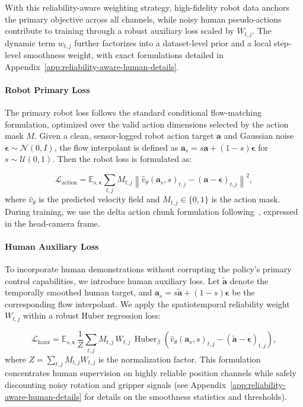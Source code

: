 \documentclass{llmxive}
\begin{document}
With this reliability-aware weighting strategy, high-fidelity robot data anchors the primary objective across all channels, while noisy human pseudo-actions contribute to training through a robust auxiliary loss scaled by \(W_{t,j}\). The dynamic term \(w_{t,j}\) further factorizes into a dataset-level prior and a local step-level smoothness weight, with exact formulations detailed in Appendix~\ref{app:reliability-aware-human-details}.

\paragraph{Robot Primary Loss}

The primary robot loss follows the standard conditional flow-matching formulation, optimized over the valid action dimensions selected by the action mask $M$. Given a clean, sensor-logged robot action target $\mathbf{a}$ and Gaussian noise $\boldsymbol{\epsilon} \sim \mathcal{N}(0, I)$, the flow interpolant is defined as $\mathbf{a}_s = s\mathbf{a} + (1{-}s)\boldsymbol{\epsilon}$ for $s \sim \mathcal{U}(0,1)$. Then the robot loss is formulated as:


\begin{equation}
\label{equ:action_loss}
\mathcal{L}_{\mathrm{action}}
=
\mathbb{E}_{s,\boldsymbol{\epsilon}}
\sum_{t,j}
M_{t,j}
\left\|
\hat{v}_\theta(\mathbf{a}_s, s)_{t,j}
-
(\mathbf{a} - \boldsymbol{\epsilon})_{t,j}
\right\|^2,
\end{equation}
where $\hat{v}_\theta$ is the predicted velocity field and $M_{t,j} \in \{0,1\}$ is the action mask. During training, we use the delta action chunk formulation following~\cite{BlackK-RSS-25}, expressed in the head-camera frame.



\paragraph{Human Auxiliary Loss}
\label{sec:human-auxiliary-loss}

To incorporate human demonstrations without corrupting the policy's primary control capabilities, we introduce human auxiliary loss. Let $\tilde{\mathbf{a}}$ denote the temporally smoothed human target, and $\mathbf{a}_s = s\tilde{\mathbf{a}} + (1{-}s)\boldsymbol{\epsilon}$ be the corresponding flow interpolant. We apply the spatiotemporal reliability weight $W_{t,j}$ within a robust Huber regression loss:

\begin{equation}
  \mathcal{L}_{\mathrm{haux}}
  =
  \mathbb{E}_{s,\boldsymbol{\epsilon}}\,
  \frac{1}{Z}
  \sum_{t,j}
  M_{t,j}\,
  W_{t,j}\,
  \operatorname{Huber}_{\beta}\!\left(
  \hat{v}_\theta(\mathbf{a}_s, s)_{t,j}
  -
  (\tilde{\mathbf{a}} - \boldsymbol{\epsilon})_{t,j}
  \right),
\end{equation}
where $Z = \sum_{t,j} M_{t,j} W_{t,j}$ is the normalization factor. This formulation concentrates human supervision on highly reliable position channels while safely discounting noisy rotation and gripper signals (see Appendix~\ref{app:reliability-aware-human-details} for details on the smoothness statistics and thresholds).
\end{document}
